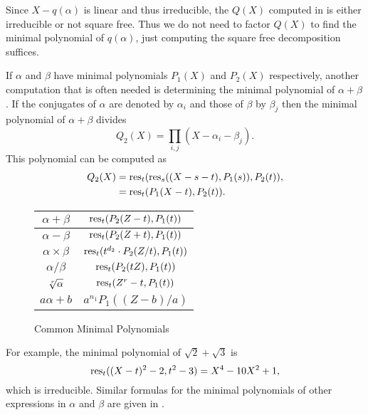 Since $X - q(\alpha)$ is linear and thus irreducible, the $Q(X)$
computed in  is either irreducible or not square
free.  Thus we do not need to factor $Q(X)$ to find the minimal
polynomial of $q(\alpha)$, just computing the square free
decomposition suffices.

\medskip
If $\alpha$ and $\beta$ have minimal polynomials $P_1(X)$ and $P_2(X)$
respectively, another computation that is often needed is determining
the minimal polynomial of $\alpha + \beta$.  If the
conjugates of $\alpha$ are denoted by $\alpha_i$ and
those of $\beta$ by $\beta_j$ then the minimal polynomial of
$\alpha+\beta$ divides
\begin{equation} \label{AlgSum:Min:Eq}
Q_2(X) = \prod_{i,j} (X - \alpha_i - \beta_j).
\end{equation}
This polynomial can be computed as 
\[
\begin{aligned}
Q_2(X) & = \mathop{\rm res}\nolimits_t ( \mathop{\rm res}\nolimits_s ((X- s - t), P_1(s)), P_2(t)), \\
  & = \mathop{\rm res}\nolimits_t (P_1(X - t), P_2(t)).
\end{aligned}
\]

\begin{figure}
\begin{center}
\begin{tabular}{|c|c|} \hline
$\alpha + \beta$ & $\mathop{\rm res}\nolimits_t(P_2(Z - t), P_1(t))$ \\[3pt] \hline
$\alpha - \beta$ & $\mathop{\rm res}\nolimits_t(P_2(Z + t), P_1(t))$ \\[3pt] \hline
$\alpha \times \beta$ & $\mathop{\rm res}\nolimits_t(t^{d_2} \cdot P_2(Z/t), P_1(t))$ \\[3pt] \hline
$\alpha / \beta$ & $\mathop{\rm res}\nolimits_t(P_2(t Z), P_1(t))$ \\[3pt] \hline
$\root r \of{\alpha}$ & $\mathop{\rm res}\nolimits_t(Z^r - t, P_1(t))$ \\[3pt] \hline
$a \alpha + b$ & $a^{n_1} P_1((Z - b)/a)$ \\[3pt] \hline
\end{tabular}
\end{center}
\caption{Common Minimal Polynomials \label{Minimal:Polynomial:Fig}}
\end{figure}

For example, the minimal polynomial of $\sqrt{2} + \sqrt{3}$ is 
\[
\mathop{\rm res}\nolimits_t((X -t)^2 - 2, t^2 - 3) = X^4 - 10X^2 + 1,
\]
which is irreducible.  Similar formulas for the minimal polynomials of 
other expressions in $\alpha$ and $\beta$ are given in 
. 


